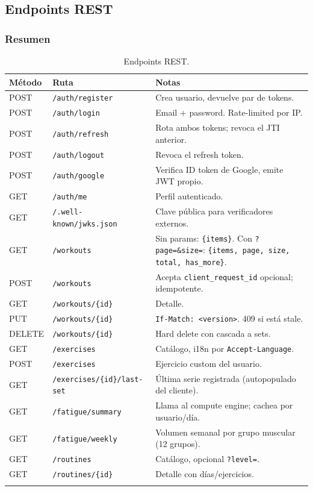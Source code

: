 \documentclass[11pt,a4paper]{article}
\newcommand{\http}[1]{\texttt{\small #1}}
\begin{document}
\subsection{Endpoints REST}

\subsubsection{Resumen}

\begin{longtable}{lp{}p{}}
\toprule
\textbf{Método} & \textbf{Ruta} & \textbf{Notas} \\
\midrule
\endhead
POST   & \http{/auth/register}        & Crea usuario, devuelve par de tokens. \\
POST   & \http{/auth/login}           & Email + password. Rate-limited por IP. \\
POST   & \http{/auth/refresh}         & Rota ambos tokens; revoca el JTI anterior. \\
POST   & \http{/auth/logout}          & Revoca el refresh token. \\
POST   & \http{/auth/google}          & Verifica ID token de Google, emite JWT propio. \\
GET    & \http{/auth/me}              & Perfil autenticado. \\
GET    & \http{/.well-known/jwks.json}& Clave pública para verificadores externos. \\
GET    & \http{/workouts}             & Sin params: \texttt{\{items\}}. Con \texttt{?page=\&size=}: \texttt{\{items, page, size, total, has\_more\}}. \\
POST   & \http{/workouts}             & Acepta \texttt{client\_request\_id} opcional; idempotente. \\
GET    & \http{/workouts/\{id\}}      & Detalle. \\
PUT    & \http{/workouts/\{id\}}      & \texttt{If-Match: <version>}. 409 si está stale. \\
DELETE & \http{/workouts/\{id\}}      & Hard delete con cascada a sets. \\
GET    & \http{/exercises}            & Catálogo, i18n por \texttt{Accept-Language}. \\
POST   & \http{/exercises}            & Ejercicio custom del usuario. \\
GET    & \http{/exercises/\{id\}/last-set} & Última serie registrada (autopopulado del cliente). \\
GET    & \http{/fatigue/summary}      & Llama al compute engine; cachea por usuario/día. \\
GET    & \http{/fatigue/weekly}       & Volumen semanal por grupo muscular (12 grupos). \\
GET    & \http{/routines}             & Catálogo, opcional \texttt{?level=}. \\
GET    & \http{/routines/\{id\}}      & Detalle con días/ejercicios. \\
\bottomrule
\caption{Endpoints REST.}\\
\end{longtable}
\end{document}
